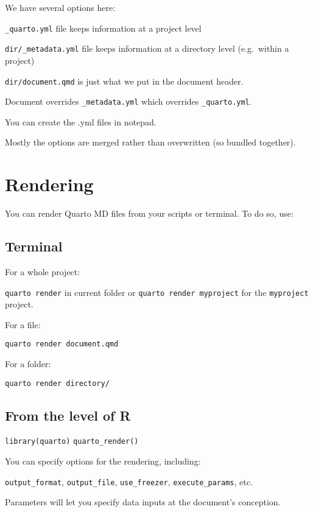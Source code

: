 \documentclass[
  letterpaper,
  DIV=11,
  numbers=noendperiod]{scrartcl}
\begin{document}
We have several options here:

\texttt{\_quarto.yml} file keeps information at a project level

\texttt{dir/\_metadata.yml} file keeps information at a directory level
(e.g.~within a project)

\texttt{dir/document.qmd} is just what we put in the document header.

Document overrides \texttt{\_metadata.yml} which overrides
\texttt{\_quarto.yml}.

You can create the .yml files in notepad.

Mostly the options are merged rather than overwritten (so bundled
together).

\hypertarget{rendering}{%
\section{Rendering}\label{rendering}}

You can render Quarto MD files from your scripts or terminal. To do so,
use:

\hypertarget{terminal}{%
\subsection{Terminal}\label{terminal}}

For a whole project:

\texttt{quarto\ render} in current folder or
\texttt{quarto\ render\ myproject} for the \texttt{myproject} project.

For a file:

\texttt{quarto\ render\ document.qmd}

For a folder:

\texttt{quarto\ render\ directory/}

\hypertarget{from-the-level-of-r}{%
\subsection{From the level of R}\label{from-the-level-of-r}}

\texttt{library(quarto)} \texttt{quarto\_render()}

You can specify options for the rendering, including:

\texttt{output\_format}, \texttt{output\_file}, \texttt{use\_freezer},
\texttt{execute\_params}, etc.

Parameters will let you specify data inputs at the document's
conception.
\end{document}
